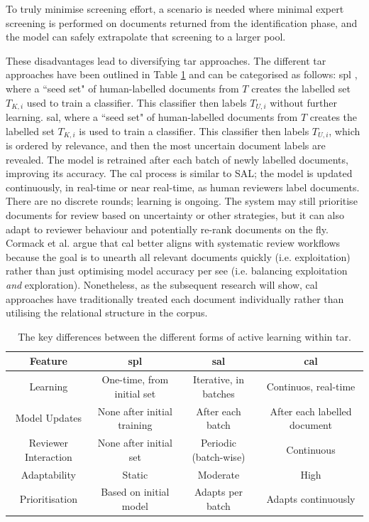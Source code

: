 \documentclass[10pt,oneside]{book}
\begin{document}
To truly minimise screening effort, a scenario is needed where minimal expert screening is performed on documents returned from the identification phase, and the model can safely extrapolate that screening to a larger pool.

These disadvantages lead to diversifying \gls*{tar} approaches. The different \gls*{tar} approaches have been outlined in Table \ref{tab:differences_in_tar} and can be categorised as follows: \gls*{spl} \cite{cohen_reducing_2006}, where a ``seed set" of human-labelled documents from $T$ creates the labelled set $T_{K,i}$ used to train a classifier. This classifier then labels $T_{U, i}$ without further learning. \gls*{sal}, where a ``seed set" of human-labelled documents from $T$ creates the labelled set $T_{K,i}$ is used to train a classifier. This classifier then labels $T_{U, i}$, which is ordered by relevance, and then the most uncertain document labels are revealed. The model is retrained after each batch of newly labelled documents, improving its accuracy. The \gls*{cal} process is similar to SAL; the model is updated continuously, in real-time or near real-time, as human reviewers label documents. There are no discrete rounds; learning is ongoing. The system may still prioritise documents for review based on uncertainty or other strategies, but it can also adapt to reviewer behaviour and potentially re-rank documents on the fly. Cormack et al. \cite{cormack_autonomy_2015} argue that \gls*{cal} better aligns with systematic review workflows because the goal is to unearth all relevant documents quickly (i.e. exploitation) rather than just optimising model accuracy per see (i.e. balancing exploitation \emph{and} exploration). Nonetheless, as the subsequent research will show, \gls*{cal} approaches have traditionally treated each document individually rather than utilising the relational structure in the corpus.


\begin{table}[t]

    \centering
    \footnotesize
    \begin{tabular}{|c|c|c|c|}
        \hline
        \textbf{Feature} & \textbf{\gls*{spl}} & \textbf{\gls*{sal}} & \textbf{\gls*{cal}} \\
        \hline
        Learning & One-time, from initial set  & Iterative, in batches  & Continuos, real-time \\
        \hline
        Model Updates & None after initial training & After each batch & After each labelled document \\
        \hline
        Reviewer Interaction & None after initial set & Periodic (batch-wise) & Continuous \\
        \hline
        Adaptability & Static  & Moderate & High \\
        \hline
        Prioritisation & Based on initial model & Adapts per batch & Adapts continuously \\
        \hline
    \end{tabular}
    \caption{The key differences between the different forms of active learning within \gls*{tar}.}
    \label{tab:differences_in_tar}
\end{table}
\end{document}
